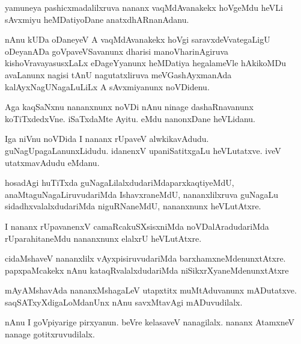 \documentclass{article}
\begin{document}
\begin{mn}%
yamuneya pashicxmadalilxruva nananx vaqMdAvanakekx hoVgeMdu heVLi sAvxmiyu heMDatiyoDane 
anatxdhARnanAdanu.
\end{mn}

\begin{mn}%
nAnu kUDa oDaneyeV A vaqMdAvanakekx hoVgi saravxdeVvategaLigU oDeyanADa goVpaveVSavanunx 
dharisi manoVharinAgiruva kishoVravayasusxLaLx eDageYyanunx heMDatiya hegalameVle 
hAkikoMDu avaLanunx nagisi tAnU nagutatxliruva meVGashAyxmanAda kalAyxNagUNagaLuLiLx A 
sAvxmiyanunx noVDidenu.
\end{mn}

\begin{mn}%
Aga kaqSaNxnu nananxnunx noVDi nAnu ninage dashaRnavanunx koTiTxdedxVne. iSaTxdaMte Ayitu. 
eMdu nanonxDane heVLidanu.
\end{mn}

\begin{mn}%
Iga niVnu noVDida I nananx rUpaveV alwkikavAdudu. guNagUpagaLanunxLidudu. idanenxV 
upaniSatitxgaLu heVLutatxve. iveV utatxmavAdudu eMdanu.
\end{mn}

\begin{mn}%
hosadAgi huTiTxda guNagaLilalxdudariMdaparxkaqtiyeMdU, anaMtaguNagaLiruvudariMda 
IshavxraneMdU, nananxlilxruva guNagaLu sidadhxvalalxdudariMda niguRNaneMdU, nananxnunx 
heVLutAtxre.
\end{mn}

\begin{mn}%
I nananx rUpavanenxV camaRcakuSXsisxniMda noVDalAradudariMda rUparahitaneMdu nananxnunx 
elalxrU heVLutAtxre.
\end{mn}

\begin{mn}%
cidaMshaveV nananxlilx vAyxpisiruvudariMda barxhamxneMdenunxtAtxre. papxpaMcakekx nAnu 
kataqRvalalxdudariMda niSikxrXyaneMdenunxtAtxre
\end{mn}

\begin{mn}%
mAyAMshavAda nananxMshagaLeV utapxtitx muMtAduvanunx mADutatxve. saqSATxyXdigaLoMdanUnx 
nAnu savxMtavAgi mADuvudilalx.
\end{mn}

\begin{mn}%
nAnu I goVpiyarige pirxyanun. beVre kelasaveV nanagilalx. nananx AtamxneV nanage 
gotitxruvudilalx.
\end{mn}
\end{document}
